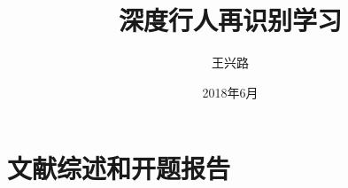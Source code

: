 \documentclass[fangfont=FangSong,heifont=SimHei]{zju-thesis}
\title{深度行人再识别学习}{浙江大学本科生毕业论文}
\author{王兴路}{3140102282}
\date{2018年6月}
\begin{document}
	\makecover
    \tableofcontents
	\begin{refsection}
	
	
	\end{refsection}
	
	
	\part{文献综述和开题报告}
	\renewcommand\thechapter{\zhnum{chapter}、} 
	
\end{document}
